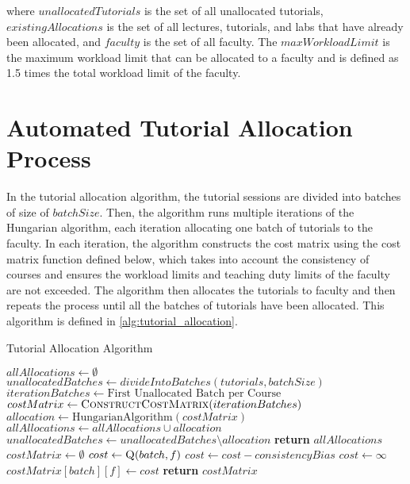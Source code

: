where $unallocatedTutorials$ is the set of all unallocated tutorials, $existingAllocations$ is the set of all lectures, tutorials, and labs that have already been allocated, and $faculty$ is the set of all faculty. The $maxWorkloadLimit$ is the maximum workload limit that can be allocated to a faculty and is defined as 1.5 times the total workload limit of the faculty.

\section{Automated Tutorial Allocation Process}

In the tutorial allocation algorithm, the tutorial sessions are divided into batches of size of $batchSize$. Then, the algorithm runs multiple iterations of the Hungarian algorithm, each iteration allocating one batch of tutorials to the faculty. In each iteration, the algorithm constructs the cost matrix using the cost matrix function defined below, which takes into account the consistency of courses and ensures the workload limits and teaching duty limits of the faculty are not exceeded. The algorithm then allocates the tutorials to faculty and then repeats the process until all the batches of tutorials have been allocated. This algorithm is defined in \autoref{alg:tutorial_allocation}.

\begin{algorithm}[H]
  \caption{Tutorial Allocation Algorithm}
  \begin{algorithmic}
    \State $allAllocations \gets \emptyset$
    \State $unallocatedBatches \gets divideIntoBatches(tutorials, batchSize)$
    \State $iterationBatches \gets \text{First Unallocated Batch per Course}$
    \State $costMatrix \gets \Call{ConstructCostMatrix}{iterationBatches}$
    \State $allocation \gets \text{HungarianAlgorithm}(costMatrix)$
    \State $allAllocations \gets allAllocations \cup allocation$
    \State $unallocatedBatches \gets unallocatedBatches \setminus allocation$
    \EndWhile
    \State \textbf{return} $allAllocations$
    \EndProcedure
    \\
    \State $costMatrix \gets \emptyset$
    \State $cost \gets \Call{Q}{batch, f}$
    \State $cost \gets cost - consistencyBias$
    \EndIf
    \State $cost \gets \infty$
    \EndIf
    \State $costMatrix[batch][f] \gets cost$
    \EndFor
    \EndFor
    \State \textbf{return} $costMatrix$
    \EndProcedure
  \end{algorithmic}
  \label{alg:tutorial_allocation}
\end{algorithm}

